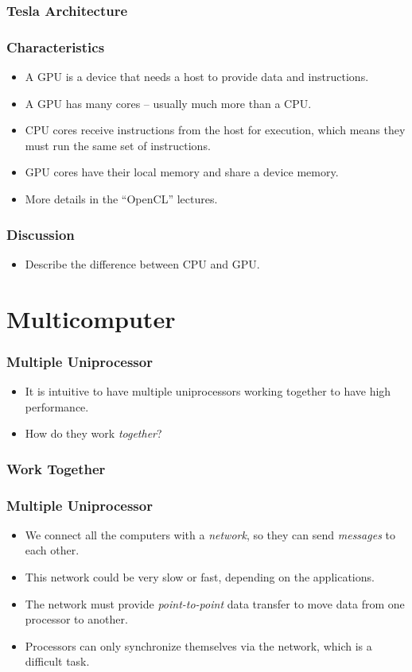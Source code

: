 \documentclass{beamer}
\begin{document}
\begin{CJK}{UTF8}{bsmi}
\begin{frame}
\frametitle{Tesla Architecture}
\centerline{}
\end{frame}

\begin{frame}
\frametitle{Characteristics}
\begin{itemize}
\item A GPU is a device that needs a host to provide data and instructions.
\item A GPU has many cores -- usually much more than a CPU.
\item CPU cores receive instructions from the host for execution, which means they must run the same set of instructions.
\item  GPU cores have their local memory and share a device memory.
\item More details in the ``OpenCL'' lectures.
\end{itemize}
\end{frame}


\begin{frame}
\frametitle{Discussion}
\begin{itemize}
\item Describe the difference between CPU and GPU.
\end{itemize}
\end{frame}


\section{Multicomputer}

\begin{frame}
\frametitle{Multiple Uniprocessor}
\begin{itemize}
\item It is intuitive to have multiple uniprocessors working together
  to have high performance.
\item How do they work {\em together}?
\end{itemize}
\end{frame}


\begin{frame}
\frametitle{Work Together}
\centerline{}
\end{frame}


\begin{frame}
\frametitle{Multiple Uniprocessor}
\begin{itemize}
\item We connect all the computers with a {\em network}, so they can
  send {\em messages} to each other.
\item This network could be very slow or fast, depending on the
  applications.
\item The network must provide {\em point-to-point} data transfer to
  move data from one processor to another.
\item Processors can only synchronize themselves via the network, which
  is a difficult task.
\end{itemize}
\end{frame}


\end{CJK}
\end{document}

